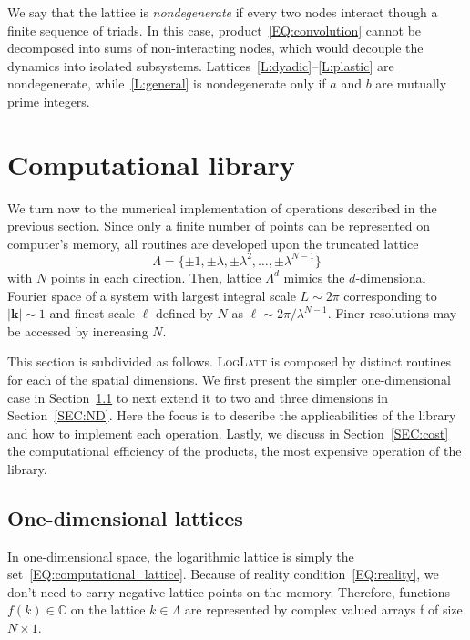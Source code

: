\documentclass[12pt]{article}
\theoremstyle{definition}
\begin{document}
	We say that the lattice is \textit{nondegenerate} if every two nodes interact though a finite sequence of triads.
	In this case, product~\eqref{EQ:convolution} cannot be decomposed into sums of non-interacting nodes, which would decouple the dynamics into isolated subsystems.
	Lattices~\ref{L:dyadic}--\ref{L:plastic} are nondegenerate, while~\ref{L:general} is nondegenerate only if $a$ and $b$ are mutually prime integers.
	
	\section{Computational library}\label{SEC:library}
	
	We turn now to the numerical implementation of operations described in the previous section.
	Since only a finite number of points can be represented on computer's memory, all routines are developed upon the truncated lattice
	\begin{equation}
	\mathbb{\Lambda} = \{ \pm 1, \pm \lambda, \pm \lambda^2, \dots, \pm \lambda^{N-1} \}
	\label{EQ:computational_lattice}
	\end{equation}
	with $N$ points in each direction.
	Then, lattice $\mathbb{\Lambda}^d$ mimics the $d$-dimensional Fourier space of a system with largest integral scale $L \sim 2\pi$ corresponding to $|\mathbf{k}| \sim 1$ and finest scale $\ell$ defined by $N$ as $\ell \sim 2\pi/\lambda^{N-1}$.
	Finer resolutions may be accessed by increasing $N$.
	
	This section is subdivided as follows.
	\textsc{LogLatt} is composed by distinct routines for each of the spatial dimensions.
	We first present the simpler one-dimensional case in Section~\ref{SEC:1D} to next extend it to two and three dimensions in Section~\ref{SEC:ND}.
	Here the focus is to describe the applicabilities of the library and how to implement each operation.
	Lastly, we discuss in Section~\ref{SEC:cost} the computational efficiency of the products, the most expensive operation of the library.
	
	\subsection{One-dimensional lattices}\label{SEC:1D}
	
	In one-dimensional space, the logarithmic lattice is simply the set~\eqref{EQ:computational_lattice}.
	Because of reality condition~\eqref{EQ:reality}, we don't need to carry negative lattice points on the memory.
	Therefore, functions $f(k) \in \mathbb{C}$ on the lattice $k \in \mathbb{\Lambda}$ are represented by complex valued arrays {\mlttfamily f} of size $N \times 1$.
	
\end{document}
